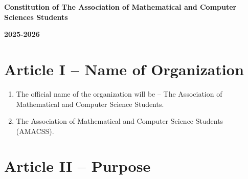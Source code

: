 \documentclass[12pt,a4paper]{article}
\begin{document}
\begin{center}
{\Large\textbf{Constitution of The Association of Mathematical and Computer Sciences Students}}

\vspace{0.5cm}
{\large\textbf{2025-2026}}
\end{center}

\vspace{1cm}

\section*{Article I – Name of Organization}

\begin{enumerate}
\item The official name of the organization will be – The Association of Mathematical and Computer Science Students.

\item The Association of Mathematical and Computer Science Students (AMACSS).
\end{enumerate}

\section*{Article II – Purpose}
\end{document}
